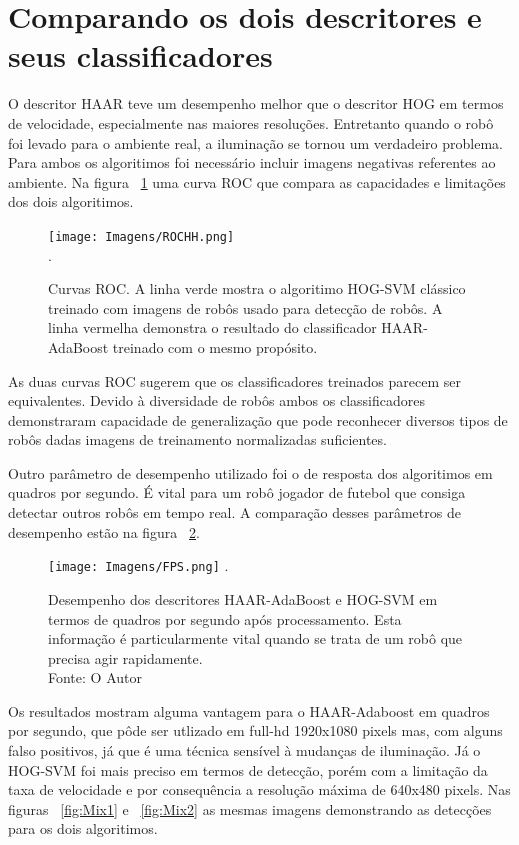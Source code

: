 \section{Comparando os dois descritores e seus classificadores} 

O descritor HAAR teve um desempenho melhor que o descritor HOG em termos de velocidade, especialmente nas maiores resoluções. Entretanto quando o robô foi levado para o ambiente real, a iluminação se tornou um verdadeiro problema. Para ambos os algoritimos foi necessário incluir imagens negativas referentes ao ambiente. Na figura ~\ref{fig_rocHH} uma curva ROC que compara as capacidades e limitações dos dois algoritimos. 

\begin{figure}[!hH]
\centering
\texttt{[image: Imagens/ROCHH.png]}\\
\DeclareGraphicsExtensions.
\caption{Curvas ROC. A linha verde mostra o algoritimo HOG-SVM clássico treinado com imagens de robôs usado para detecção de robôs.
A linha vermelha demonstra o resultado do classificador HAAR-AdaBoost treinado com o mesmo propósito.}
\label{fig_rocHH}
\end{figure}

As duas curvas ROC sugerem que os classificadores treinados parecem ser equivalentes. Devido à diversidade de robôs ambos os classificadores demonstraram capacidade de generalização que pode reconhecer diversos tipos de robôs dadas imagens de treinamento normalizadas suficientes.

Outro parâmetro de desempenho utilizado foi o de resposta dos algoritimos em quadros por segundo. É vital para um robô jogador de futebol que consiga detectar outros robôs em tempo real. A comparação desses parâmetros de desempenho estão na figura ~\ref{fig_fps}.

\begin{figure}[!hH]
\centering
\texttt{[image: Imagens/FPS.png]}
\DeclareGraphicsExtensions.
\caption{Desempenho dos descritores HAAR-AdaBoost e HOG-SVM em termos de quadros por segundo após processamento. Esta informação é particularmente vital quando se trata de um robô que precisa agir rapidamente.\\ Fonte: O Autor}
\label{fig_fps}
\end{figure}

Os resultados mostram alguma vantagem para o HAAR-Adaboost em quadros por segundo, que pôde ser utlizado em full-hd 1920x1080 pixels mas, com alguns falso positivos, já que é uma técnica sensível à mudanças de iluminação. Já o HOG-SVM foi mais preciso em termos de detecção, porém com a limitação da taxa de velocidade e por consequência a resolução máxima de 640x480 pixels. Nas figuras ~\ref{fig:Mix1} e ~\ref{fig:Mix2} as mesmas imagens demonstrando as detecções para os dois algoritimos.

